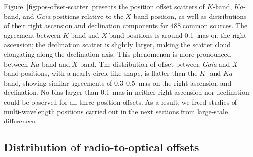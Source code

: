 \documentclass{aa}
\begin{document}
   Figure~\ref{fig:pos-offset-scatter} presents the position offset scatters of $K$-band, $Ka$-band, and \textit{Gaia} positions relative to the $X$-band position, as well as distributions of their right ascension and declination components for 488 common sources.
   The agreement between $K$-band and $X$-band positions is around 0.1~mas on the right ascension;
   the declination scatter is slightly larger, making the scatter cloud elongating along the declination axis.
   This phenomenon is more pronounced between $Ka$-band and $X$-band.
   The distribution of offset between \textit{Gaia} and $X$-band positions, with a nearly circle-like shape, is flatter than the $K$- and $Ka$-band, showing similar agreements of 0.3--0.5~mas on the right ascension and declination.
   No bias larger than 0.1~mas in neither right ascension nor declination could be observed for all three position offsets.
   As a result, we freed studies of multi-wavelength positions carried out in the next sections from large-scale differences. %

%

\subsection{Distribution of radio-to-optical offsets}    \label{subsec:r2o-dist}
\end{document}
